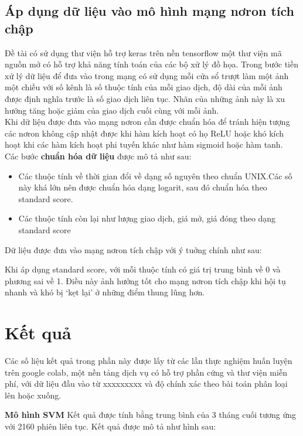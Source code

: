  \subsection{Áp dụng dữ liệu vào mô hình mạng nơron tích chập}
 Đề tài có sử dụng thư viện hỗ trợ keras trên nền tensorflow một thư viện mã nguồn mở có hỗ trợ khả năng tính toán của các bộ xử lý đồ họa. Trong bước tiền xử lý dữ liệu để đưa vào trong mạng có sử dụng mỗi cửa sổ trượt làm một ảnh một chiều với số kênh là số thuộc tính của mỗi giao dịch, độ dài của mỗi ảnh được định nghĩa trước là số giao dịch liên tục. Nhãn của những ảnh này là xu hướng tăng hoặc giảm của giao dịch cuối cùng với mỗi ảnh.\\
 Khi dữ liệu được đưa vào mạng nơron cần được chuẩn hóa để tránh hiện tượng các nơron không cập nhật được khi hàm kích hoạt có họ ReLU hoặc khó kích hoạt khi các hàm kích hoạt phi tuyến khác như hàm sigmoid hoặc hàm tanh.\\ Các bước \textbf{chuẩn hóa dữ liệu} được mô tả như sau:
 \begin{itemize}
 	\item Các thuộc tính về thời gian đổi về dạng số nguyên theo chuẩn UNIX.Các số này khá lớn nên được chuẩn hóa dạng logarit, sau đó chuẩn hóa theo standard score.
 	\item Các thuộc tính còn lại như lượng giao dịch, giá mở, giá đóng theo dạng standard score
 \end{itemize}

Dữ liệu được đưa vào mạng nơron tích chập với ý tuởng chính như sau:



Khi áp dụng standard score, với mỗi thuộc tính có giá trị trung bình về 0 và phương sai về 1. Điều này ảnh hưởng tốt cho mạng nơron tích chập khi hội tụ nhanh và khó bị `kẹt lại' ở những điểm thung lũng hơn.

 
 \section{Kết quả}
 Các số liệu kết quả trong phần này được lấy từ các lần thực nghiệm huấn luyện trên google colab, một nền tảng dịch vụ có hỗ trợ phần cứng và thư viện miễn phí, với dữ liệu đầu vào từ  xxxxxxxxx và độ chính xác theo bài toán phân loại lên hoặc xuống.
 
 \textbf{Mô hình SVM} Kết quả được tính bằng trung bình của 3 tháng cuối tương ứng với 2160 phiên liên tục. Kết quả được mô tả như hình sau:\\

